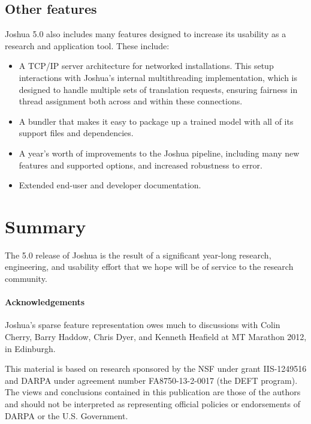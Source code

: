 \documentclass[11pt]{article}
\begin{document}
\subsection{Other features}
\label{sec:other}

Joshua 5.0 also includes many features designed to increase its
usability as a research and application tool.  These include:

\begin{itemize}
\item A TCP/IP server architecture for networked installations.  This
  setup interactions with Joshua's internal multithreading
  implementation, which is designed to handle multiple sets of
  translation requests, ensuring fairness in thread assignment both
  across and within these connections.
\item A bundler that makes it easy to package up a trained model with
  all of its support files and dependencies.
\item A year's worth of improvements to the Joshua pipeline, including many
  new features and supported options, and increased robustness to error.
\item Extended end-user and developer documentation.
\end{itemize}

\section{Summary}

The 5.0 release of Joshua is the result of a significant year-long
research, engineering, and usability effort that we hope will be of
service to the research community. 

\paragraph{Acknowledgements}

Joshua's sparse feature representation owes much to discussions with
Colin Cherry, Barry Haddow, Chris Dyer, and Kenneth Heafield at MT
Marathon 2012, in Edinburgh.

This material is based on research sponsored by the NSF under grant
IIS-1249516 and DARPA under agreement number FA8750-13-2-0017 (the
DEFT program). The views and conclusions contained in this publication
are those of the authors and should not be interpreted as representing
official policies or endorsements of DARPA or the U.S. Government.




\end{document}
